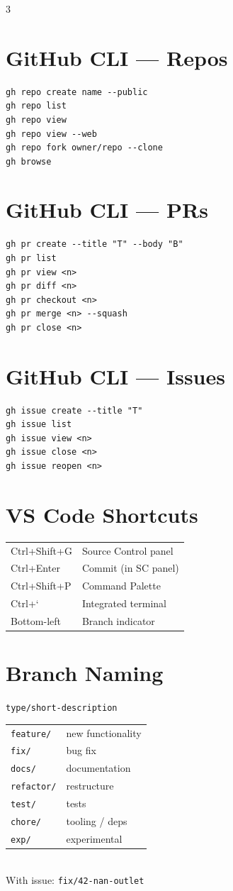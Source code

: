 \documentclass[10pt, a4paper, landscape]{article}
\begin{document}
\begin{multicols}{3}
\section{GitHub CLI --- Repos}
\begin{verbatim}
gh repo create name --public
gh repo list
gh repo view
gh repo view --web
gh repo fork owner/repo --clone
gh browse
\end{verbatim}

\section{GitHub CLI --- PRs}
\begin{verbatim}
gh pr create --title "T" --body "B"
gh pr list
gh pr view <n>
gh pr diff <n>
gh pr checkout <n>
gh pr merge <n> --squash
gh pr close <n>
\end{verbatim}

\section{GitHub CLI --- Issues}
\begin{verbatim}
gh issue create --title "T"
gh issue list
gh issue view <n>
gh issue close <n>
gh issue reopen <n>
\end{verbatim}

\section{VS Code Shortcuts}
\begin{tabular}{@{} l l @{}}
  Ctrl+Shift+G  & Source Control panel \\
  Ctrl+Enter    & Commit (in SC panel) \\
  Ctrl+Shift+P  & Command Palette \\
  Ctrl+`        & Integrated terminal \\
  Bottom-left   & Branch indicator \\
\end{tabular}

\section{Branch Naming}
\texttt{type/short-description}\\[2pt]
\begin{tabular}{@{} l l @{}}
  \texttt{feature/} & new functionality \\
  \texttt{fix/}     & bug fix \\
  \texttt{docs/}    & documentation \\
  \texttt{refactor/}& restructure \\
  \texttt{test/}    & tests \\
  \texttt{chore/}   & tooling / deps \\
  \texttt{exp/}     & experimental \\
\end{tabular}\\[2pt]
With issue: \texttt{fix/42-nan-outlet}


\end{multicols}
\end{document}

